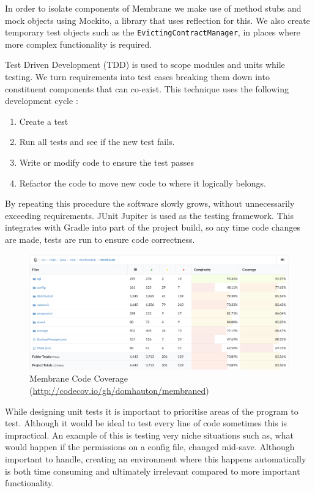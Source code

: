 \documentclass[11pt, a4paper, twocolumn, twoside]{report}
\def\code#1{\texttt{#1}}
\begin{document}
In order to isolate components of Membrane we make use of method stubs and mock objects \citep{osherove2015art} using Mockito, a library that uses reflection for this. We also create temporary test objects such as the \code{EvictingContractManager}, in places where more complex functionality is required.

Test Driven Development (TDD) is used to scope modules and units while testing. We turn requirements into test cases breaking them down into constituent components that can co-exist. This technique uses the following development cycle \citep{beck2003test}:

\begin{enumerate}
 \item Create a test
 \item Run all tests and see if the new test fails.
 \item Write or modify code to ensure the test passes
 \item Refactor the code to move new code to where it logically belongs.
\end{enumerate}

By repeating this procedure the software slowly grows, without unnecessarily exceeding requirements. JUnit Jupiter is used as the testing framework. This integrates with Gradle into part of the project build, so any time code changes are made, tests are run to ensure code correctness.

\begin{figure}[!ht]
 \centering
 \includegraphics[width=\textwidth]{code-coverage}
 \caption{Membrane Code Coverage (\url{http://codecov.io/gh/domhauton/membraned})}
 \label{fig:code-coverage}
\end{figure}

While designing unit tests it is important to prioritise areas of the program to test. Although it would be ideal to test every line of code sometimes this is impractical. An example of this is testing very niche situations such as, what would happen if the permissions on a config file, changed mid-save. Although important to handle, creating an environment where this happens automatically is both time consuming and ultimately irrelevant compared to more important functionality.
\end{document}
